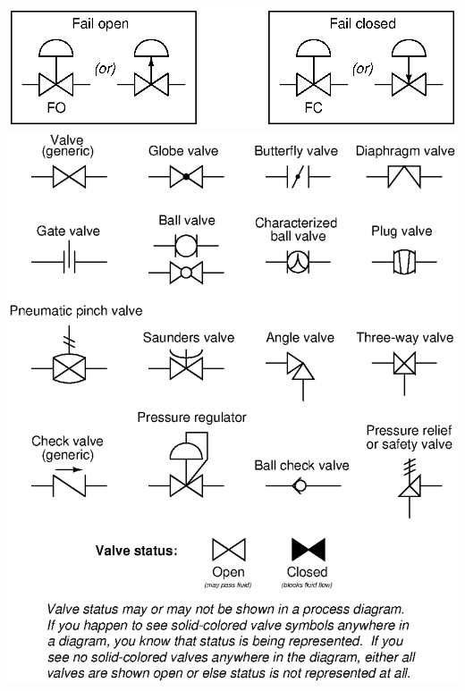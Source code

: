 \includegraphics[width=1\textwidth]{diagrams05.eps}
\includegraphics[width=1\textwidth]{diagrams02.eps}
